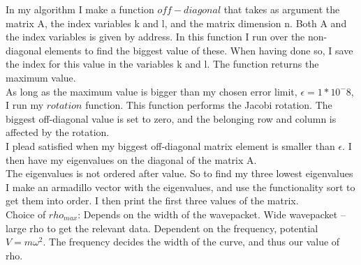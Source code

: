 \documentclass[a4paper,12pt, english]{article}
\begin{document}
  
In my algorithm I make a function $off-diagonal$ that takes as argument the matrix A, the index variables k and l, and the matrix dimension n. Both A and the index variables is given by address. In this function I run over the non-diagonal elements to find the biggest value of these. When having done so, I save the index for this value in the variables k and l. The function returns the maximum value. \\ 

As long as the maximum value is bigger than my chosen error limit, $\epsilon = 1*10^-8$, I run my $rotation$ function. This function performs the Jacobi rotation. The biggest off-diagonal value is set to zero, and the belonging row and column is affected by the rotation. \\

I plead satisfied when my biggest off-diagonal matrix element is smaller than $\epsilon$. I then have my eigenvalues on the diagonal of the matrix A. \\

The eigenvalues is not ordered after value. So to find my three lowest eigenvalues I make an armadillo vector with the eigenvalues, and use the functionality sort to get them into order. I then print the first three values of the matrix. \\

Choice of $rho_{max}$:
Depends on the width of the wavepacket. Wide wavepacket -- large rho to get the relevant data. Dependent on the frequency, potential $V = m \omega ^ 2$. The frequency decides the width of the curve, and thus our value of rho.   
 
\end{document}
